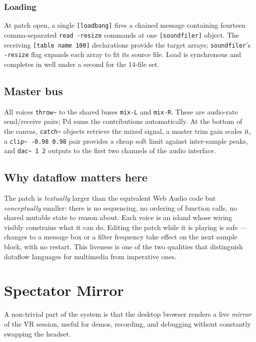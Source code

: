\documentclass[11pt,a4paper]{article}
\begin{document}
\subsubsection*{Loading}

At patch open, a single \texttt{[loadbang]} fires a chained message
containing fourteen comma-separated \texttt{read -resize} commands at
one \texttt{[soundfiler]} object. The receiving
\texttt{[table \textit{name} 100]} declarations provide the target
arrays; \texttt{soundfiler}'s \texttt{-resize} flag expands each array
to fit its source file. Load is synchronous and completes in well
under a second for the 14-file set.

\subsection{Master bus}

All voices \texttt{throw\~{}} to the shared buses \texttt{mix-L} and
\texttt{mix-R}. These are audio-rate send/receive pairs; Pd sums the
contributions automatically. At the bottom of the canvas,
\texttt{catch\~{}} objects retrieve the mixed signal, a master trim
gain scales it, a \texttt{clip\~{} -0.98 0.98} pair provides a cheap
soft limit against inter-sample peaks, and \texttt{dac\~{} 1 2}
outputs to the first two channels of the audio interface.

\subsection{Why dataflow matters here}

The patch is \emph{textually} larger than the equivalent Web Audio
code but \emph{conceptually} smaller: there is no sequencing, no
ordering of function calls, no shared mutable state to reason about.
Each voice is an island whose wiring visibly constrains what it can
do. Editing the patch while it is playing is safe --- changes to a
message box or a filter frequency take effect on the next sample
block, with no restart. This liveness is one of the two qualities
that distinguish dataflow languages for multimedia from imperative
ones.

\section{Spectator Mirror}

A non-trivial part of the system is that the desktop browser renders
a live \emph{mirror} of the VR session, useful for demos, recording,
and debugging without constantly swapping the headset.
\end{document}

